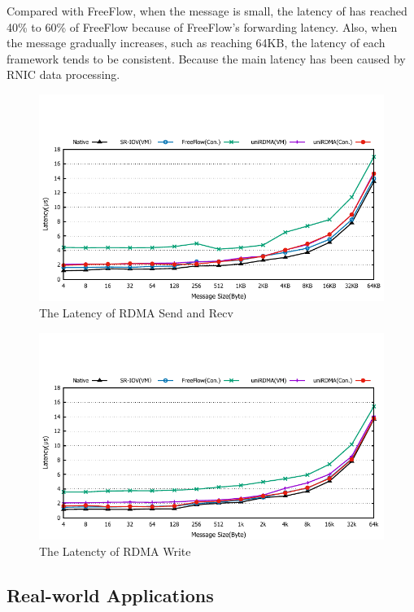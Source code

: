 Compared with FreeFlow, when the message is small, the latency of \sys has reached 40\% to 60\% of FreeFlow because of FreeFlow's forwarding latency. Also, when the message gradually increases, such as reaching 64KB, the latency of each framework tends to be consistent. Because the main latency has been caused by RNIC data processing.

\begin{figure}[!ht]
	\centering
	\includegraphics[width=1.0\linewidth]{images/send-lat.pdf}
	\caption{The Latency of RDMA Send and Recv}
	\label{fig:send-lat}
\end{figure}

\begin{figure}[!ht]
	\centering
	\includegraphics[width=1.0\linewidth]{images/write-lat.pdf}
	\caption{The Latencty of RDMA Write}
	\label{fig:write-lat}
\end{figure}

\subsection{Real-world Applications}
\
\noindent

